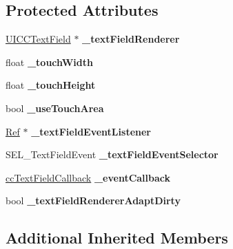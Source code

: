 \subsection*{Protected Attributes}
\begin{DoxyCompactItemize}
\item 
\mbox{\label{classui_1_1TextField_ad747473132e1bd920eba3176f5f023a7}} 
\hyperlink{classui_1_1UICCTextField}{U\+I\+C\+C\+Text\+Field} $\ast$ {\bfseries \+\_\+text\+Field\+Renderer}
\item 
\mbox{\label{classui_1_1TextField_a8023517ee9a04628801466f5fe05d9d9}} 
float {\bfseries \+\_\+touch\+Width}
\item 
\mbox{\label{classui_1_1TextField_aa01861b35eeaf0e47a84d1abece78597}} 
float {\bfseries \+\_\+touch\+Height}
\item 
\mbox{\label{classui_1_1TextField_a802480451606bb03e2eaa4fe35432100}} 
bool {\bfseries \+\_\+use\+Touch\+Area}
\item 
\mbox{\label{classui_1_1TextField_aeaacfe11c275741a07d9981e147c3eaf}} 
\hyperlink{classRef}{Ref} $\ast$ {\bfseries \+\_\+text\+Field\+Event\+Listener}
\item 
\mbox{\label{classui_1_1TextField_afec317b1f91d6e44401c49a13d96a9e9}} 
S\+E\+L\+\_\+\+Text\+Field\+Event {\bfseries \+\_\+text\+Field\+Event\+Selector}
\item 
\mbox{\label{classui_1_1TextField_ad0aa3de543bc6f8d817761882916e6fd}} 
\hyperlink{classui_1_1TextField_a8b58cb15659d59187cfa0586d1420f1f}{cc\+Text\+Field\+Callback} {\bfseries \+\_\+event\+Callback}
\item 
\mbox{\label{classui_1_1TextField_ab7cdf2126969a6ec2b260565e2b6bbda}} 
bool {\bfseries \+\_\+text\+Field\+Renderer\+Adapt\+Dirty}
\end{DoxyCompactItemize}
\subsection*{Additional Inherited Members}


